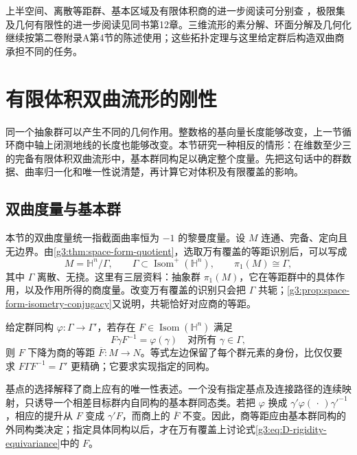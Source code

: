 上半空间、离散等距群、基本区域及有限体积商的进一步阅读可分别查
\cite[第4.6、5.3、6.6、10.3节]{Ratcliffe2019}，极限集及几何有限性的进一步阅读见同书第12章。三维流形的素分解、环面分解及几何化继续按第二卷附录A第4节的陈述使用；这些拓扑定理与这里给定群后构造双曲商承担不同的任务。

\section{有限体积双曲流形的刚性}
\label{g3:sec:D05}

同一个抽象群可以产生不同的几何作用。整数格的基向量长度能够改变，上一节循环商中轴上闭测地线的长度也能够改变。本节研究一种相反的情形：在维数至少三的完备有限体积双曲流形中，基本群同构足以确定整个度量。先把这句话中的群数据、曲率归一化和唯一性说清楚，再计算它对体积及有限覆盖的影响。

\subsection{双曲度量与基本群}
\label{g3:subsec:D05:01}

本节的双曲度量统一指截面曲率恒为 \(-1\) 的黎曼度量。设 \(M\) 连通、完备、定向且无边界。由\cref{g3:thm:space-form-quotient}，选取万有覆盖的等距识别后，可以写成
\[
	M=\mathbb H^n/\Gamma,\qquad
	\Gamma\subset\operatorname{Isom}^+(\mathbb H^n),\qquad
	\pi_1(M)\cong\Gamma,
\]
其中 \(\Gamma\) 离散、无挠。这里有三层资料：抽象群 \(\pi_1(M)\)，它在等距群中的具体作用，以及作用所得的商度量。改变万有覆盖的识别只会把 \(\Gamma\) 共轭；\cref{g3:prop:space-form-isometry-conjugacy}又说明，共轭恰好对应商的等距。

\ProseParagraphBreak
给定群同构 \(\varphi:\Gamma\to\Gamma'\)，若存在 \(F\in\operatorname{Isom}(\mathbb H^n)\) 满足
\begin{equation}\label{g3:eq:D-rigidity-equivariance}
	F\gamma F^{-1}=\varphi(\gamma)
	\quad\text{对所有 }\gamma\in\Gamma,
\end{equation}
则 \(F\) 下降为商的等距 \(\overline F:M\to N\)。等式左边保留了每个群元素的身份，比仅仅要求 \(F\Gamma F^{-1}=\Gamma'\) 更精确；它要求实现指定的同构。

\ProseParagraphBreak
基点的选择解释了商上应有的唯一性表述。一个没有指定基点及连接路径的连续映射，只诱导一个相差目标群内自同构的基本群同态类。若把 \(\varphi\) 换成 \(\gamma'\varphi(\,\cdot\,)\gamma'^{-1}\)，相应的提升从 \(F\) 变成 \(\gamma'F\)，而商上的 \(\overline F\) 不变。因此，商等距应由基本群同构的外同构类决定；指定具体同构以后，才在万有覆盖上讨论式\eqref{g3:eq:D-rigidity-equivariance}中的 \(F\)。

